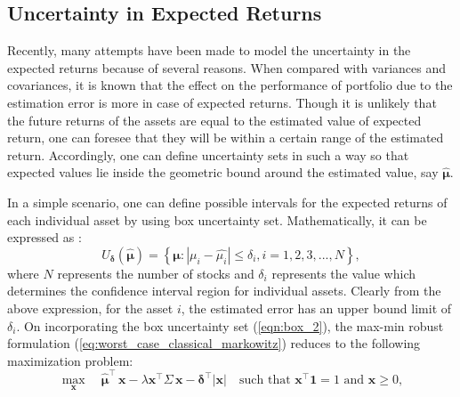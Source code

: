 \subsection{Uncertainty in Expected Returns}
Recently, many attempts have been made to model the uncertainty in the expected returns because of several reasons. When compared with variances and covariances, it is known that the effect on the performance of portfolio due to the estimation error is more in case of expected returns. Though it is unlikely that the future returns of the assets are equal to the estimated value of expected return, one can foresee that they will be within a certain range of the estimated return. Accordingly, one can define uncertainty sets in such a way so that expected values lie inside the geometric bound around the estimated value, say $\boldsymbol{\hat{\mu}}$.

In a simple scenario, one can define possible intervals for the expected returns of each individual asset by using box uncertainty set. Mathematically, it can be expressed as \cite{kim}:
\begin{equation}
\label{eqn:box_2}
U_{\boldsymbol{\delta}}(\boldsymbol{\hat{\mu}}) = \left\{ \boldsymbol{\mu}: | \mu_i - \hat{\mu_i}| \leq \delta_i, i = 1,2,3,...,N \right\},    
\end{equation}
where $N$ represents the number of stocks and $\delta_i$ represents the value which determines the confidence interval region for individual assets. Clearly from the above expression, for the asset $i$, the estimated error has an upper bound limit of $\delta_i$. 
On incorporating the box uncertainty set (\ref{eqn:box_2}), the max-min robust formulation (\ref{eq:worst_case_classical_markowitz}) reduces to the following maximization problem:
\begin{equation}
\label{eqn:trans_eqn_box}
\max_\mathbf{x} \quad \boldsymbol{\hat{\mu}}^{\top} \, \mathbf{x}-  \lambda \mathbf{x^{\top}}\Sigma \, \mathbf{x} - \boldsymbol{\delta}^{\top}|\mathbf{x}| \quad \text{such that } \mathbf{x^{\top}}\mathbf{1}  = 1 \text{ and } \mathbf{x} \geq 0,  
\end{equation}

